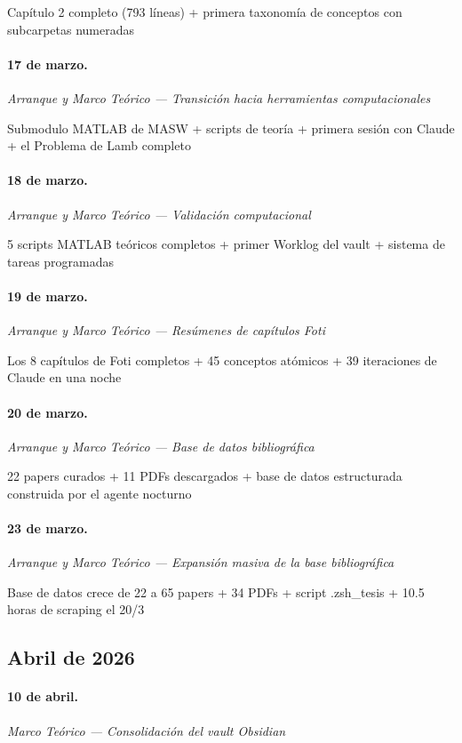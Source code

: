 Capítulo 2 completo (793 líneas) + primera taxonomía de conceptos con subcarpetas numeradas

\paragraph{17 de marzo.}
\emph{Arranque y Marco Teórico --- Transición hacia herramientas computacionales}

Submodulo MATLAB de MASW + scripts de teoría + primera sesión con Claude + el Problema de Lamb completo

\paragraph{18 de marzo.}
\emph{Arranque y Marco Teórico --- Validación computacional}

5 scripts MATLAB teóricos completos + primer Worklog del vault + sistema de tareas programadas

\paragraph{19 de marzo.}
\emph{Arranque y Marco Teórico --- Resúmenes de capítulos Foti}

Los 8 capítulos de Foti completos + 45 conceptos atómicos + 39 iteraciones de Claude en una noche

\paragraph{20 de marzo.}
\emph{Arranque y Marco Teórico --- Base de datos bibliográfica}

22 papers curados + 11 PDFs descargados + base de datos estructurada construida por el agente nocturno

\paragraph{23 de marzo.}
\emph{Arranque y Marco Teórico --- Expansión masiva de la base bibliográfica}

Base de datos crece de 22 a 65 papers + 34 PDFs + script .zsh\_tesis + 10.5 horas de scraping el 20/3

\subsection{Abril de 2026}
\paragraph{10 de abril.}
\emph{Marco Teórico --- Consolidación del vault Obsidian}

